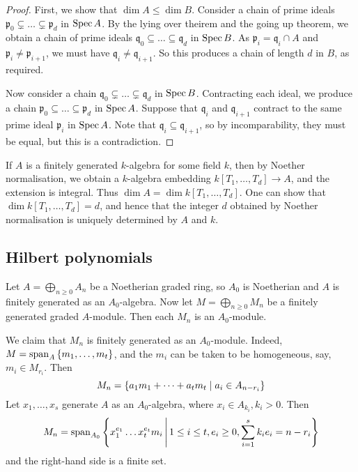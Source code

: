 \begin{proof}
    First, we show that \( \dim A \leq \dim B \).
    Consider a chain of prime ideals \( \mathfrak p_0 \subsetneq \dots \subsetneq \mathfrak p_d \) in \( \operatorname{Spec} A \).
    By the lying over theirem and the going up theorem, we obtain a chain of prime ideals \( \mathfrak q_0 \subseteq \dots \subseteq \mathfrak q_d \) in \( \operatorname{Spec} B \).
    As \( \mathfrak p_i = \mathfrak q_i \cap A \) and \( \mathfrak p_i \neq \mathfrak p_{i+1} \), we must have \( \mathfrak q_i \neq \mathfrak q_{i+1} \).
    So this produces a chain of length \( d \) in \( B \), as required.

    Now consider a chain \( \mathfrak q_0 \subsetneq \dots \subsetneq \mathfrak q_d \) in \( \operatorname{Spec} B \).
    Contracting each ideal, we produce a chain \( \mathfrak p_0 \subseteq \dots \subseteq \mathfrak p_d \) in \( \operatorname{Spec} A \).
    Suppose that \( \mathfrak q_i \) and \( \mathfrak q_{i+1} \) contract to the same prime ideal \( \mathfrak p_i \) in \( \operatorname{Spec} A \).
    Note that \( \mathfrak q_i \subseteq \mathfrak q_{i+1} \), so by incomparability, they must be equal, but this is a contradiction.
\end{proof}
\begin{remark}
    If \( A \) is a finitely generated \( k \)-algebra for some field \( k \), then by Noether normalisation, we obtain a \( k \)-algebra embedding \( k[T_1, \dots, T_d] \to A \), and the extension is integral.
    Thus \( \dim A = \dim k[T_1, \dots, T_d] \).
    One can show that \( \dim k[T_1, \dots, T_d] = d \), and hence that the integer \( d \) obtained by Noether normalisation is uniquely determined by \( A \) and \( k \).
\end{remark}

\subsection{Hilbert polynomials}
Let \( A = \bigoplus_{n \geq 0} A_n \) be a Noetherian graded ring, so \( A_0 \) is Noetherian and \( A \) is finitely generated as an \( A_0 \)-algebra.
Now let \( M = \bigoplus_{n \geq 0} M_n \) be a finitely generated graded \( A \)-module.
Then each \( M_n \) is an \( A_0 \)-module.

We claim that \( M_n \) is finitely generated as an \( A_0 \)-module.
Indeed, \( M = \operatorname{span}_A\qty{m_1, \dots, m_t} \), and the \( m_i \) can be taken to be homogeneous, say, \( m_i \in M_{r_i} \).
Then
\[ M_n = \qty{a_1 m_1 + \dots + a_t m_t \mid a_i \in A_{n-r_i}} \]
Let \( x_1, \dots, x_s \) generate \( A \) as an \( A_0 \)-algebra, where \( x_i \in A_{k_i}, k_i > 0 \).
Then
\[ M_n = \operatorname{span}_{A_0}\qty{x_1^{e_1} \dots x_t^{e_t} m_i \,\middle|\,1 \leq i \leq t, e_i \geq 0, \sum_{i=1}^s k_i e_i = n - r_i} \]
and the right-hand side is a finite set.

